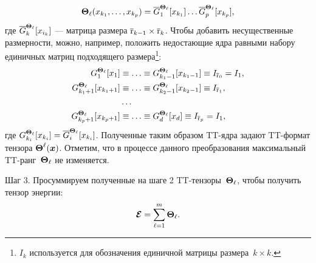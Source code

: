 \begin{equation}
\label{energy:tt-for-partial-potential}
\boldsymbol{\Theta}_\ell(x_{k_1}, \ldots, x_{k_p}) = \overline{G}^{\boldsymbol{\Theta}_\ell}_1[x_{k_1}] \ldots \overline{G}^{\boldsymbol{\Theta}_\ell}_p[x_{k_p}],
\end{equation}
где $\overline{G}^{\boldsymbol{\Theta}_\ell}_k[x_{i_k}]$ --- матрица размера $\overline{\operatorname{r}}_{k-1} \times \overline{\operatorname{r}}_k$. Чтобы добавить несущественные размерности, можно, например, положить недостающие ядра равными набору единичных матриц подходящего размера\footnote{$I_k$ используется для обозначения единичной матрицы размера~$k \times k$.}:
\begin{equation*}
\begin{aligned}
G^{\boldsymbol{\Theta}_\ell}_1[x_1] &\equiv  \ldots \equiv G^{\boldsymbol{\Theta}_\ell}_{k_1 - 1}[x_{k_1 - 1}] \equiv I_{\overline{\operatorname{r}}_0} = I_1,\\
G^{\boldsymbol{\Theta}_\ell}_{k_1 + 1}[x_{k_1 + 1}] &\equiv \ldots \equiv G^{\boldsymbol{\Theta}_\ell}_{k_2 - 1}[x_{k_2 - 1}] \equiv I_{\overline{\operatorname{r}}_1},\\
&\ldots\\
G^{\boldsymbol{\Theta}_\ell}_{k_p + 1}[x_{k_p + 1}] &\equiv \ldots \equiv G^{\boldsymbol{\Theta}_\ell}_{d}[x_{d}] \equiv I_{\overline{\operatorname{r}}_p} = I_1,
\end{aligned}
\end{equation*}
где $G^{\boldsymbol{\Theta}_\ell}_{k_i}[x_{k_i}] = \overline{G}^{\boldsymbol{\Theta}_\ell}_{i}[x_{k_i}]$. Полученные таким образом TT\hyp{}ядра задают TT\hyp{}формат тензора $\boldsymbol{\Theta}^\ell(\boldsymbol{x})$.
Отметим, что в процессе данного преобразования максимальный TT\hyp{}ранг~$\boldsymbol{\Theta}_\ell$ не изменяется.

Шаг 3. Просуммируем полученные на шаге 2 TT\hyp{}тензоры~$\boldsymbol{\Theta}_\ell$, чтобы получить тензор энергии:
\begin{equation}
\label{energy:energy-tensor-as-sum-of-potential-tensors}
\boldsymbol{\mathcal{E}} = \sum_{\ell=1}^m \boldsymbol{\Theta}_\ell.
\end{equation}

